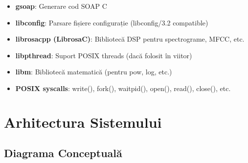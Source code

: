 \documentclass[12pt,a4paper,twoside]{article}
\begin{document}
\begin{itemize}
    \item \textbf{gsoap}: Generare cod SOAP C
    \item \textbf{libconfig}: Parsare fișiere configurație (libconfig/3.2 compatible)
    \item \textbf{librosacpp (LibrosaC)}: Bibliotecă DSP pentru spectrograme, MFCC, etc.
    \item \textbf{libpthread}: Suport POSIX threads (dacă folosit în viitor)
    \item \textbf{libm}: Bibliotecă matematică (pentru pow, log, etc.)
    \item \textbf{POSIX syscalls}: write(), fork(), waitpid(), open(), read(), close(), etc.
\end{itemize}

\section{Arhitectura Sistemului}

\subsection{Diagrama Conceptuală}
\end{document}
